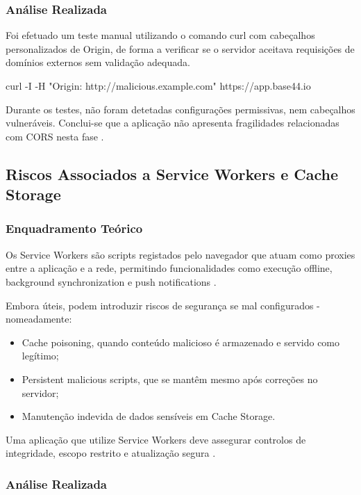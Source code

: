 \subsubsection{Análise Realizada}

Foi efetuado um teste manual utilizando o comando curl com cabeçalhos personalizados de Origin, de forma a verificar se o servidor aceitava requisições de domínios externos sem validação adequada.

curl -I -H "Origin: http://malicious.example.com" https://app.base44.io

Durante os testes, não foram detetadas configurações permissivas, nem cabeçalhos vulneráveis. Conclui-se que a aplicação não apresenta fragilidades relacionadas com CORS nesta fase \cite{ref7}.

\subsection{Riscos Associados a Service Workers e Cache Storage}

\subsubsection{Enquadramento Teórico}

Os Service Workers são scripts registados pelo navegador que atuam como proxies entre a aplicação e a rede, permitindo funcionalidades como execução offline, background synchronization e push notifications \cite{ref8}.

Embora úteis, podem introduzir riscos de segurança se mal configurados - nomeadamente:

\begin{itemize}

\item Cache poisoning, quando conteúdo malicioso é armazenado e servido como legítimo;

\item Persistent malicious scripts, que se mantêm mesmo após correções no servidor;

\item Manutenção indevida de dados sensíveis em Cache Storage.

\end{itemize}

Uma aplicação que utilize Service Workers deve assegurar controlos de integridade, escopo restrito e atualização segura \cite{ref9}.

\subsubsection{Análise Realizada}

